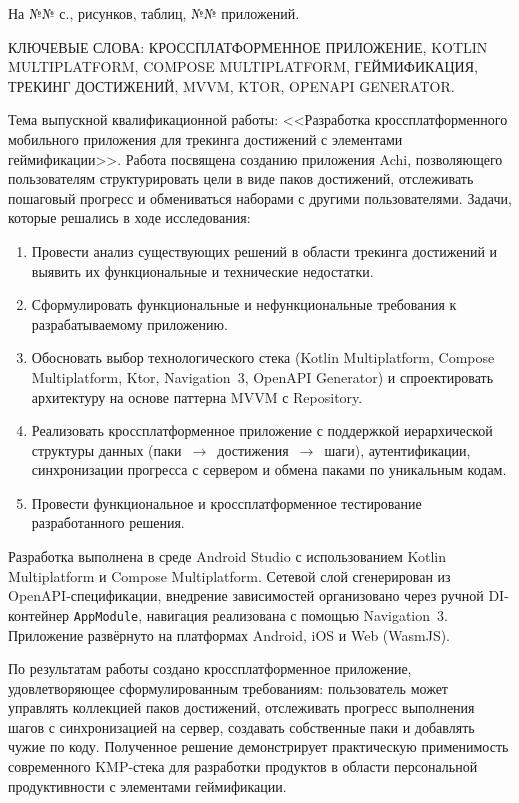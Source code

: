 \documentclass[../main.tex]{subfiles}
\begin{document}
	\thispagestyle{empty}
	
	\noindent
	На №№ с.,  рисунков,  таблиц, №№ приложений.
	
	КЛЮЧЕВЫЕ СЛОВА: КРОССПЛАТФОРМЕННОЕ ПРИЛОЖЕНИЕ, KOTLIN MULTIPLATFORM, COMPOSE MULTIPLATFORM, ГЕЙМИФИКАЦИЯ, ТРЕКИНГ ДОСТИЖЕНИЙ, MVVM, KTOR, OPENAPI GENERATOR.
	
	Тема выпускной квалификационной работы: <<Разработка кроссплатформенного мобильного приложения для трекинга достижений с элементами геймификации>>. Работа посвящена созданию приложения Achi, позволяющего пользователям структурировать цели в виде паков достижений, отслеживать пошаговый прогресс и обмениваться наборами с другими пользователями.
	Задачи, которые решались в ходе исследования:
	\begin{enumerate}
		\item Провести анализ существующих решений в области трекинга достижений и выявить их функциональные и технические недостатки.
		\item Сформулировать функциональные и нефункциональные требования к разрабатываемому приложению.
		\item Обосновать выбор технологического стека (Kotlin Multiplatform, Compose Multiplatform, Ktor, Navigation~3, OpenAPI Generator) и спроектировать архитектуру на основе паттерна MVVM с Repository.
		\item Реализовать кроссплатформенное приложение с поддержкой иерархической структуры данных (паки~$\rightarrow$~достижения~$\rightarrow$~шаги), аутентификации, синхронизации прогресса с сервером и обмена паками по уникальным кодам.
		\item Провести функциональное и кроссплатформенное тестирование разработанного решения.
	\end{enumerate}
	
	Разработка выполнена в среде Android Studio с использованием Kotlin Multiplatform и Compose Multiplatform. Сетевой слой сгенерирован из OpenAPI-спецификации, внедрение зависимостей организовано через ручной DI-контейнер \texttt{AppModule}, навигация реализована с помощью Navigation~3. Приложение развёрнуто на платформах Android, iOS и Web (WasmJS).
	
	По результатам работы создано кроссплатформенное приложение, удовлетворяющее сформулированным требованиям: пользователь может управлять коллекцией паков достижений, отслеживать прогресс выполнения шагов с синхронизацией на сервер, создавать собственные паки и добавлять чужие по коду. Полученное решение демонстрирует практическую применимость современного KMP-стека для разработки продуктов в области персональной продуктивности с элементами геймификации.
	
\end{document}
